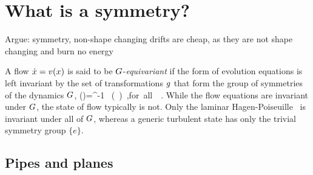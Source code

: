 

\section{What is a symmetry?}
\label{s:symm}

    \ifdraft\color{blue}
Argue: symmetry, non-shape changing  drifts are cheap, as they are not
shape changing and burn no energy
    \color{black}\fi

A flow $\dot{x}= v(x)$ is said to be $G$-\emph{equivariant}
if the form of evolution equations  is left invariant
by the set of transformations $g$ that form the group of symmetries
of the dynamics $G$,
\beq
\vel(\ssp)=\LieEl^{-1} \, \vel(\LieEl \, \ssp)
\,,\qquad \mbox{for all } \LieEl \in {\Group}
\,.
While the flow equations are invariant under $G$, the state of flow
typically is not. Only the laminar Hagen-Poiseuille \eqv\ is invariant
under all of $G$, whereas a generic turbulent state has only the
trivial symmetry group $\{e\}$.

\subsection{Pipes and planes}

